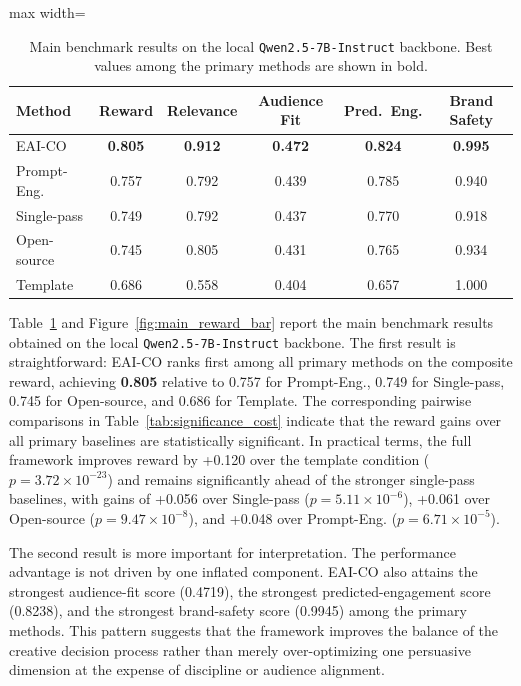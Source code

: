 \documentclass[applsci,article,submit,pdftex,moreauthors]{Definitions/mdpi}
\newcommand{\TableStyle}{\small\setlength{\tabcolsep}{6pt}\renewcommand{\arraystretch}{1.20}}
\begin{document}
\begin{table}[H]
\caption{Main benchmark results on the local \texttt{Qwen2.5-7B-Instruct} backbone. Best values among the primary methods are shown in bold.}
\label{tab:qwen_main_results}
\centering
\TableStyle
{}
\begin{adjustbox}{max width=\textwidth}
\begin{tabular}{lccccc}
\toprule
\rowcolor{tableheader}
Method & Reward & Relevance & Audience Fit & Pred.\ Eng. & Brand Safety \\
\midrule
\rowcolor{oursrow}
EAI-CO & \textbf{0.805} & \textbf{0.912} & \textbf{0.472} & \textbf{0.824} & \textbf{0.995} \\
Prompt-Eng. & 0.757 & 0.792 & 0.439 & 0.785 & 0.940 \\
Single-pass & 0.749 & 0.792 & 0.437 & 0.770 & 0.918 \\
Open-source & 0.745 & 0.805 & 0.431 & 0.765 & 0.934 \\
Template & 0.686 & 0.558 & 0.404 & 0.657 & 1.000 \\
\bottomrule
\end{tabular}
\end{adjustbox}
\end{table}

Table~\ref{tab:qwen_main_results} and Figure~\ref{fig:main_reward_bar} report the main benchmark results obtained on the local \texttt{Qwen2.5-7B-Instruct} backbone. The first result is straightforward: EAI-CO ranks first among all primary methods on the composite reward, achieving \textbf{0.805} relative to 0.757 for Prompt-Eng., 0.749 for Single-pass, 0.745 for Open-source, and 0.686 for Template. The corresponding pairwise comparisons in Table~\ref{tab:significance_cost} indicate that the reward gains over all primary baselines are statistically significant. In practical terms, the full framework improves reward by +0.120 over the template condition ($p = 3.72 \times 10^{-23}$) and remains significantly ahead of the stronger single-pass baselines, with gains of +0.056 over Single-pass ($p = 5.11 \times 10^{-6}$), +0.061 over Open-source ($p = 9.47 \times 10^{-8}$), and +0.048 over Prompt-Eng. ($p = 6.71 \times 10^{-5}$).

The second result is more important for interpretation. The performance advantage is not driven by one inflated component. EAI-CO also attains the strongest audience-fit score (0.4719), the strongest predicted-engagement score (0.8238), and the strongest brand-safety score (0.9945) among the primary methods. This pattern suggests that the framework improves the balance of the creative decision process rather than merely over-optimizing one persuasive dimension at the expense of discipline or audience alignment.
\end{document}
